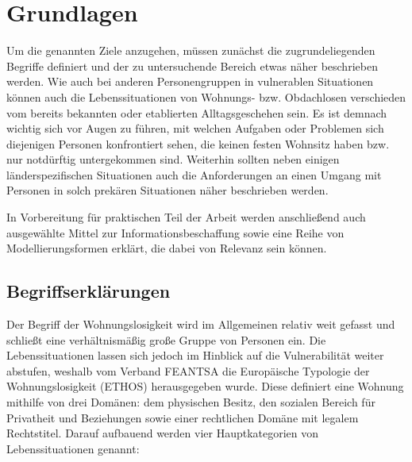 \chapter{Grundlagen}\label{ch:preliminaries}

Um die genannten Ziele anzugehen, müssen zunächst die zugrundeliegenden Begriffe definiert und der zu untersuchende Bereich etwas näher beschrieben werden. Wie auch bei anderen Personengruppen in vulnerablen Situationen können auch die Lebenssituationen von Wohnungs- bzw. Obdachlosen verschieden vom bereits bekannten oder etablierten Alltagsgeschehen sein. Es ist demnach wichtig sich vor Augen zu führen, mit welchen Aufgaben oder Problemen sich diejenigen Personen konfrontiert sehen, die keinen festen Wohnsitz haben bzw. nur notdürftig untergekommen sind. Weiterhin sollten neben einigen länderspezifischen Situationen auch die Anforderungen an einen Umgang mit Personen in solch prekären Situationen näher beschrieben werden.

In Vorbereitung für praktischen Teil der Arbeit werden anschließend auch ausgewählte Mittel zur Informationsbeschaffung sowie eine Reihe von Modellierungsformen erklärt, die dabei von Relevanz sein können.

\section{Begriffserklärungen}

Der Begriff der Wohnungslosigkeit wird im Allgemeinen relativ weit gefasst und schließt eine verhältnismäßig große Gruppe von Personen ein. Die Lebenssituationen lassen sich jedoch im Hinblick auf die Vulnerabilität weiter abstufen, weshalb vom Verband FEANTSA \citep{ethos} die Europäische Typologie der Wohnungslosigkeit (ETHOS) herausgegeben wurde. Diese definiert eine Wohnung mithilfe von drei Domänen: dem physischen Besitz, den sozialen Bereich für Privatheit und Beziehungen sowie einer rechtlichen Domäne mit legalem Rechtstitel. Darauf aufbauend werden vier Hauptkategorien von Lebenssituationen genannt:


